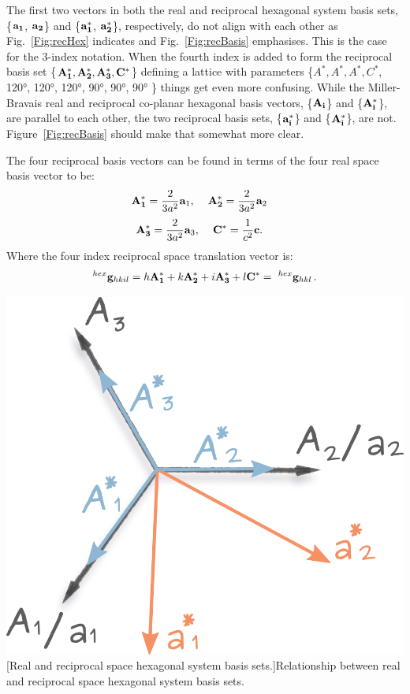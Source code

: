 The first two vectors in both the real and reciprocal hexagonal system basis sets, \{$\vb{a_1}$, $\vb{a_2}$\} and \{$\vb{a^*_1}$, $\vb{a^*_2}$\}, respectively, do not align with each other as Fig.~\ref{Fig:recHex} indicates and  Fig.~\ref{Fig:recBasis} emphasises. This is the case for the 3-index notation. When the fourth index is added to form the reciprocal basis set \{$\vb{A^*_1}, \vb{A^*_2}, \vb{A^*_3}, \vb{C^*}$\} defining a lattice with parameters \{$A^*, A^*, A^*, C^*$, 120\si{\degree}, 120\si{\degree}, 120\si{\degree}, 90\si{\degree}, 90\si{\degree}, 90\si{\degree} \}  things get even more confusing. While the Miller-Bravais real and reciprocal co-planar hexagonal basis vectors, \{$\vb{A_i}$\} and \{$\vb{A^*_i}$\}, are parallel to each other, the two reciprocal basis sets, \{$\vb{a^*_i}$\} and \{$\vb{A^*_i}$\}, are not. Figure~\ref{Fig:recBasis} should make that somewhat more clear. 

\vspace{0.3cm}
\noindent \begin{minipage}{0.5\linewidth}
The four reciprocal basis vectors can be found in terms of the four real space basis vector to be:
\begin{align*}
\vb{A^*_1} & =\frac{2}{3a^2}\vb{a}_1, \, \quad \vb{A^*_2}=\frac{2}{3a^2}\vb{a}_2 
\end{align*}%
\vspace{-1cm}%
\begin{align}
\label{eq:4recvectors}
\vb{A^*_3} & =\frac{2}{3a^2}\vb{a}_3, \, \quad \vb{C^*}=\frac{1}{c^2}\vb{c}.
\end{align}
Where the four index reciprocal space translation vector is:%
\vspace{-0.5cm}%
\begin{equation*}
^{hex}\vb{g}_{hkil} = h\vb{A^*_1}+k\vb{A^*_2}+ i\vb{A^*_3} +l\vb{C^*}= \,\, ^{hex}\vb{g}_{hkl} \,.
\end{equation*}
\end{minipage}%
\begin{minipage}{0.57\linewidth}
\centering
\includegraphics[width=.6\linewidth]{Figures/Miller_Bravais_rec.png}
[Real and reciprocal space hexagonal system basis sets.]{Relationship between real and reciprocal space hexagonal system basis sets. }
\label{Fig:recBasis}
\end{minipage}

